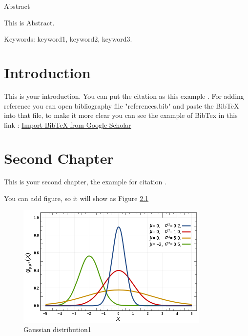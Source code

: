 \documentclass[12pt, twoside , openright]{book}
\begin{document}
	
	
	\begin{center}
		{\chinnesesize Abstract}
	\end{center}
	
	This is Abstract. \blindtext[1]
	
	
	\noindent Keywords: keyword1, keyword2, keyword3.
	\newpage
	
	
	
	
	\tableofcontents
	\newpage
	
	
	
	
	\listoffigures
	\newpage
	
	
	
	
	\listoftables
	\newpage
	
	
	
	
	\mainmatter
	
	\chapter{Introduction}
	This is your introduction. You can put the citation as this example \cite{CpLi}. For adding reference you can open bibliography file "references.bib" and paste the BibTeX into that file, to make it more clear you can see the example of BibTex in this link : \href{https://www.youtube.com/watch?v=SsJSR2b4_qc&t=107s}{Import BibTeX from Google Scholar}
	
	\blindtext[2] %
	
	
	
	
	
	\chapter{Second Chapter}
	This is your second chapter, the example for citation \cite{Ymc}. \blindtext[1]
	
	You can add figure, so it will show as Figure \ref{fig:figure_ref}
	\begin{figure}[h]
		\centerline{\includegraphics[width=0.5\columnwidth]{Images/gambar.png}}
		\caption{Gaussian distribution1}
		\label{fig:figure_ref}
	\end{figure}
	
\end{document}
